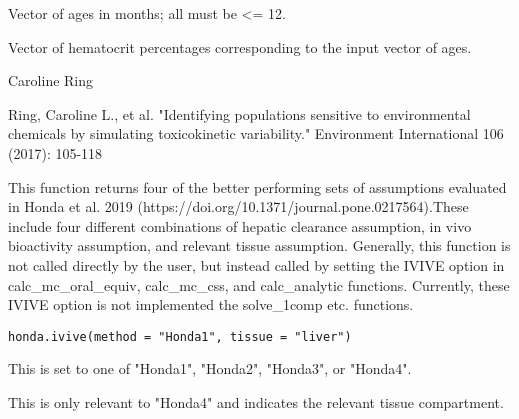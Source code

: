 \documentclass[a4paper]{book}
\begin{document}
%
\begin{Arguments}
\begin{ldescription}
\item[\code{age\_months}] Vector of ages in months; all must be <= 12.
\end{ldescription}
\end{Arguments}
%
\begin{Details}\relax

\end{Details}
%
\begin{Value}
Vector of hematocrit percentages corresponding to the input vector
of ages.
\end{Value}
%
\begin{Author}\relax
Caroline Ring
\end{Author}
%
\begin{References}\relax
Ring, Caroline L., et al. "Identifying populations sensitive to 
environmental chemicals by simulating toxicokinetic variability." Environment 
International 106 (2017): 105-118
\end{References}
%
\begin{Description}\relax
This function returns four of the better performing sets of assumptions evaluated in Honda et al. 2019 
(https://doi.org/10.1371/journal.pone.0217564).These include four different combinations of hepatic clearance assumption, in vivo bioactivity assumption, 
and relevant tissue assumption. Generally, this function is not called directly by the user, but instead
called by setting the IVIVE option in calc\_mc\_oral\_equiv, calc\_mc\_css, and calc\_analytic functions. Currently, these IVIVE option 
is not implemented the solve\_1comp etc. functions.
\end{Description}
%
\begin{Usage}
\begin{verbatim}
honda.ivive(method = "Honda1", tissue = "liver")
\end{verbatim}
\end{Usage}
%
\begin{Arguments}
\begin{ldescription}
\item[\code{method}] This is set to one of "Honda1", "Honda2", "Honda3", or "Honda4".

\item[\code{tissue}] This is only relevant to "Honda4" and indicates the relevant tissue compartment.
\end{ldescription}
\end{Arguments}
\end{document}
